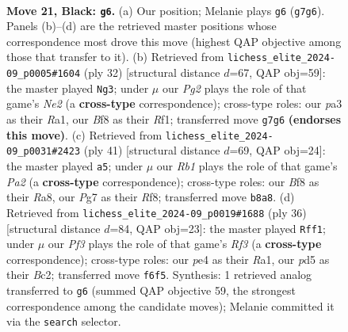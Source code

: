 \documentclass[11pt]{article}
\begin{document}
\clearpage

\begin{figure}[p]\centering
\begin{subfigure}{0.46\textwidth}\centering
\resizebox{\linewidth}{!}{%
\newchessgame
\chessboard[
  setfen={1r1q1b2/n1p1r1pk/p2p1p2/1p1Pp2p/1P2P3/P2PRN1P/3B1PP1/RQ3K2 b - - 1 21},
  showmover=false,
  pgfstyle=straightmove, color=movearrow, markmove={g7-g6}
]}
\caption{}
\end{subfigure}\hfill
\begin{subfigure}{0.46\textwidth}\centering
\resizebox{\linewidth}{!}{%
\newchessgame
\chessboard[
  setfen={1r1q1rk1/5pp1/3pbn1p/1pp5/p2pPPP1/P2P3P/1PP1N1BK/R2Q1R2 w - - 1 17},
  showmover=false,
  pgfstyle=straightmove, color=movearrow, markmove={e2-g3}
]}
\caption{}
\end{subfigure}
\\[4pt]
\begin{subfigure}{0.46\textwidth}\centering
\resizebox{\linewidth}{!}{%
\newchessgame
\chessboard[
  setfen={r4rk1/p3bn2/2q1p2p/1p1p1pp1/2pP4/P1P1PPB1/1PQN2PP/R3R1K1 b - - 0 21},
  showmover=false,
  pgfstyle=straightmove, color=movearrow, markmove={a7-a5}
]}
\caption{}
\end{subfigure}\hfill
\begin{subfigure}{0.46\textwidth}\centering
\resizebox{\linewidth}{!}{%
\newchessgame
\chessboard[
  setfen={r2qbr1k/1p4pp/p1np1p2/4pP2/PPPpP3/3P1RN1/2BQ2PP/R5K1 w - - 1 19},
  showmover=false,
  pgfstyle=straightmove, color=movearrow, markmove={f3-f1}
]}
\caption{}
\end{subfigure}
\caption{\textbf{Move 21, Black: \texttt{g6}.} (a) Our position; Melanie plays \texttt{g6} (\texttt{g7g6}). Panels (b)--(d) are the retrieved master positions whose correspondence most drove this move (highest QAP objective among those that transfer to it). (b) Retrieved from \texttt{lichess\_elite\_2024-09\_p0005\#1604} (ply 32) [structural distance $d$=67, QAP obj=59]: the master played \texttt{Ng3}; under $\mu$ our \emph{Pg2} plays the role of that game's \emph{Ne2} (a \textbf{cross-type} correspondence); cross-type roles: our \emph{p}a3 as their \emph{R}a1, our \emph{B}f8 as their \emph{R}f1; transferred move \texttt{g7g6} \textbf{(endorses this move)}. (c) Retrieved from \texttt{lichess\_elite\_2024-09\_p0031\#2423} (ply 41) [structural distance $d$=69, QAP obj=24]: the master played \texttt{a5}; under $\mu$ our \emph{Rb1} plays the role of that game's \emph{Pa2} (a \textbf{cross-type} correspondence); cross-type roles: our \emph{B}f8 as their \emph{R}a8, our \emph{P}g7 as their \emph{R}f8; transferred move \texttt{b8a8}. (d) Retrieved from \texttt{lichess\_elite\_2024-09\_p0019\#1688} (ply 36) [structural distance $d$=84, QAP obj=23]: the master played \texttt{Rff1}; under $\mu$ our \emph{Pf3} plays the role of that game's \emph{Rf3} (a \textbf{cross-type} correspondence); cross-type roles: our \emph{p}e4 as their \emph{R}a1, our \emph{p}d5 as their \emph{B}c2; transferred move \texttt{f6f5}. Synthesis: 1 retrieved analog transferred to \texttt{g6} (summed QAP objective 59, the strongest correspondence among the candidate moves); Melanie committed it via the \texttt{search} selector.}
\label{fig:thought-m41}
\end{figure}
\end{document}
